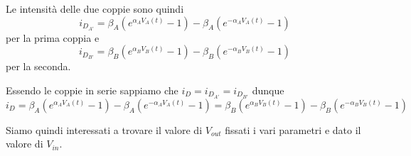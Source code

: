 		Le intensità delle due coppie sono quindi
		\[
			i_{D_{A'}} = \beta_{A}\left(e^{\alpha_{A}V_{A}(t)}-1\right)-\beta_{A}\left(e^{-\alpha_{A}V_{A}(t)}-1\right)
		\]
		per la prima coppia e
		\[
			i_{D_{B'}} = \beta_{B}\left(e^{\alpha_{B}V_{B}(t)}-1\right)-\beta_{B}\left(e^{-\alpha_{B}V_{B}(t)}-1\right)
		\]
		per la seconda.
		
		Essendo le coppie in serie sappiamo che $i_{D} = i_{D_{A'}} = i_{D_{B'}}$ dunque
		\[
			i_{D} = \beta_{A}\left(e^{\alpha_{A}V_{A}(t)}-1\right)-\beta_{A}\left(e^{-\alpha_{A}V_{A}(t)}-1\right) = \beta_{B}\left(e^{\alpha_{B}V_{B}(t)}-1\right)-\beta_{B}\left(e^{-\alpha_{B}V_{B}(t)}-1\right)
		\]
		
		Siamo quindi interessati a trovare il valore di $V_{out}$ fissati i vari parametri e dato il valore di $V_{in}$.